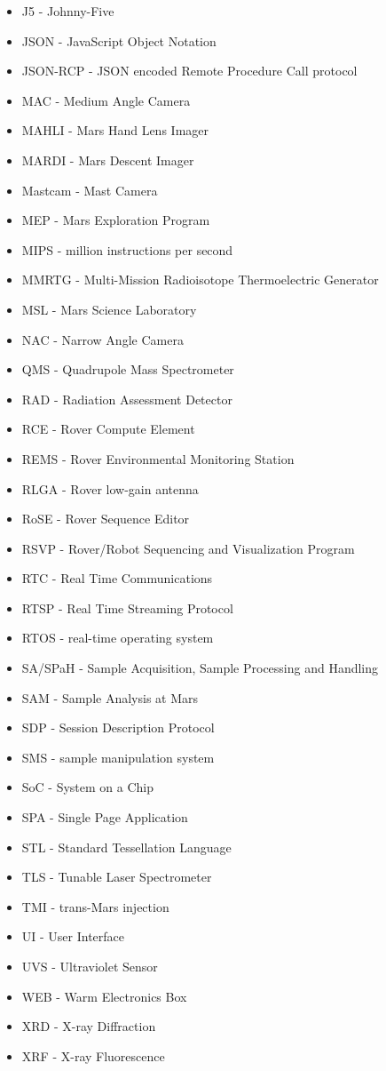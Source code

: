 \begin{itemize}
\item J5 - Johnny-Five
\item JSON - JavaScript Object Notation
\item JSON-RCP - JSON encoded Remote Procedure Call protocol

\item MAC - Medium Angle Camera
\item MAHLI - Mars Hand Lens Imager
\item MARDI - Mars Descent Imager
\item Mastcam - Mast Camera
\item MEP - Mars Exploration Program
\item MIPS - million instructions per second
\item MMRTG - Multi-Mission Radioisotope Thermoelectric Generator
\item MSL - Mars Science Laboratory

\item NAC - Narrow Angle Camera

\item QMS - Quadrupole Mass Spectrometer

\item RAD - Radiation Assessment Detector
\item RCE - Rover Compute Element
\item REMS - Rover Environmental Monitoring Station
\item RLGA - Rover low-gain antenna
\item RoSE - Rover Sequence Editor
\item RSVP - Rover/Robot Sequencing and Visualization Program
\item RTC - Real Time Communications
\item RTSP - Real Time Streaming Protocol
\item RTOS - real-time operating system

\item SA/SPaH - Sample Acquisition, Sample Processing and Handling
\item SAM - Sample Analysis at Mars
\item SDP - Session Description Protocol
\item SMS - sample manipulation system
\item SoC - System on a Chip
\item SPA - Single Page Application
\item STL - Standard Tessellation Language

\item TLS - Tunable Laser Spectrometer
\item TMI - trans-Mars injection

\item UI - User Interface
\item UVS - Ultraviolet Sensor

\item WEB - Warm Electronics Box

\item XRD - X-ray Diffraction
\item XRF - X-ray Fluorescence
\end{itemize}
